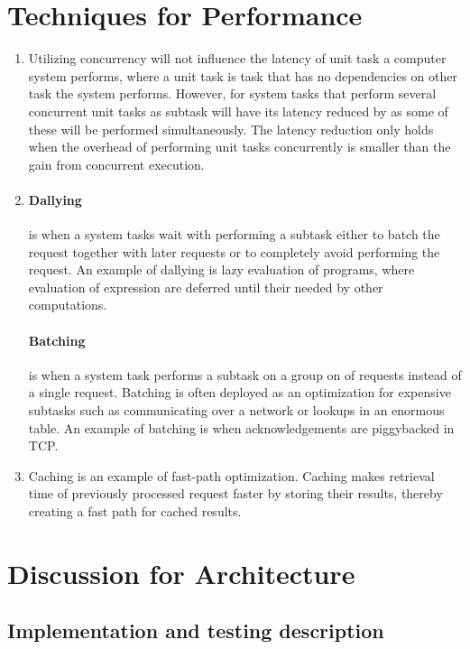 \documentclass[a4paper]{article}
\begin{document}
\section{Techniques for Performance}
\begin{enumerate}
\item Utilizing concurrency will not influence the latency of unit task a computer system performs, where a unit task is task that has no dependencies on other task the system performs. However, for system tasks that perform several concurrent unit tasks as subtask will have its latency reduced by as some of these will be performed simultaneously. The latency reduction only holds when the overhead of performing unit tasks concurrently is smaller than the gain from concurrent execution.
\item \paragraph{Dallying} is when a system tasks wait with performing a subtask either to batch the request together with later requests or to completely avoid performing the request. An example of dallying is lazy evaluation of programs, where evaluation of expression are deferred until their needed by other computations.
\paragraph{Batching} is when a system task performs a subtask on a group on of requests instead of a single request. Batching is often deployed as an optimization for expensive subtasks such as communicating over a network or lookups in an enormous table. An example of batching is when acknowledgements are piggybacked in TCP.
\item Caching is an example of fast-path optimization. Caching makes retrieval time of previously processed request faster by storing their results, thereby creating a fast path for cached results.
\end{enumerate}
\section{Discussion for Architecture}
\subsection{Implementation and testing description}
\end{document}
